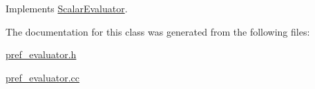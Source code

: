 Implements \hyperlink{classScalarEvaluator_a23640092537e3403bbc5b40389f7f253}{Scalar\-Evaluator}.



The documentation for this class was generated from the following files\-:\begin{DoxyCompactItemize}
\item 
\hyperlink{pref__evaluator_8h}{pref\-\_\-evaluator.\-h}\item 
\hyperlink{pref__evaluator_8cc}{pref\-\_\-evaluator.\-cc}\end{DoxyCompactItemize}
